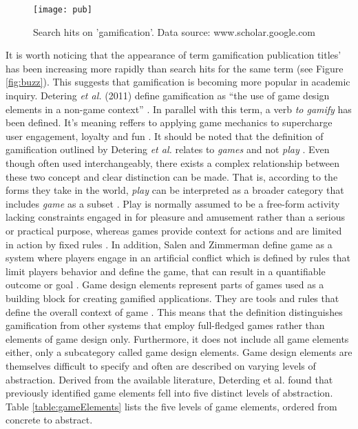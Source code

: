 \begin{figure}[h]
    \centering
    \texttt{[image: pub]}
    \caption{Search hits on 'gamification'. Data source: www.scholar.google.com}
    \label{fig:pub}
\end{figure}
It is worth noticing that the appearance of term gamification publication titles' has been increasing more rapidly than search hits for the same term (see Figure \ref{fig:buzz}). This suggests that gamification is becoming more popular in academic inquiry. 
Detering \textit{et al.} (2011) define gamification as ``the use of game design elements in a non-game context''  \cite{deterding2011game}. In parallel with this term, a verb \textit{to gamify} has been defined. It's meaning reffers to applying game mechanics to supercharge user engagement, loyalty and fun \cite{toGamify}. It should be noted that the definition of gamification outlined by Detering \textit{et al.} relates to \textit{games} and not \textit{play} \cite{deterding2011game}. Even though often used interchangeably, there exists a complex relationship between these two concept and clear distinction can be made. That is, according to the forms they take in the world, \textit{play} can be interpreted as a broader category that includes \textit{game} as a subset \cite{salen2004rules}. Play is normally assumed to be a free-form activity lacking constraints engaged in for pleasure and amusement rather than a serious or practical purpose, whereas games provide context for actions and are limited in action by fixed rules \cite{juul2011half}. In addition, Salen and Zimmerman define game as a system where players engage in an artificial conflict which is defined by rules that limit players behavior and define the game, that can result in a quantifiable outcome or goal \cite{salen2004rules}.
Game design elements represent parts of games used as a building block for creating gamified applications. They are tools and rules that define the overall context of game \cite{gamDesElem}. This means that the definition distinguishes gamification from other systems that employ full-fledged games rather than elements of game design only. Furthermore, it does not include all game elements either, only a subcategory called game design elements. %
Game design elements are themselves difficult to specify and often are described on varying levels of abstraction. Derived from the available literature, Deterding et al. found that previously identified game elements fell into five distinct levels of abstraction. Table \ref{table:gameElements} lists the five levels of game elements, ordered from concrete to abstract.

